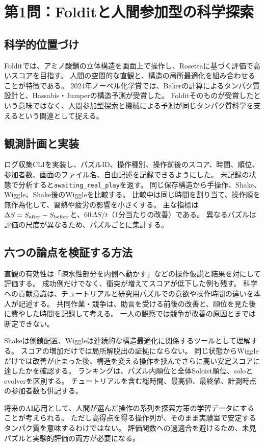 \section{第1問：Folditと人間参加型の科学探索}
\subsection{科学的位置づけ}
Folditでは、アミノ酸鎖の立体構造を画面上で操作し、Rosettaに基づく評価で高いスコアを目指す。
人間の空間的な直観と、構造の局所最適化を組み合わせることが特徴である\cite{foldit,cooper}。
2024年ノーベル化学賞では、Bakerの計算によるタンパク質設計と、Hassabis・Jumperの構造予測が受賞した\cite{nobel}。
Folditそのものが受賞したという意味ではなく、人間参加型探索と機械による予測が同じタンパク質科学を支えるという関連として捉える。

\subsection{観測計画と実装}
ログ収集CLIを実装し、パズルID、操作種別、操作前後のスコア、時間、順位、参加者数、画面のファイル名、自由記述を記録できるようにした。
未記録の状態で分析すると\texttt{awaiting\_real\_play}を返す。
同じ保存構造から手操作、Shake、Wiggle、Shake後のWiggleを比較する。
比較中は同じ時間を割り当て、操作順を無作為化して、習熟や疲労の影響を小さくする。
主な指標は\(\Delta S=S_{\rm after}-S_{\rm before}\)と、\(60\Delta S/t\)（1分当たりの改善）である。
異なるパズルは評価の尺度が異なるため、パズルごとに集計する。

\subsection{六つの論点を検証する方法}
直観の有効性は「疎水性部分を内側へ動かす」などの操作仮説と結果を対にして評価する。
成功例だけでなく、衝突が増えてスコアが低下した例も残す。
科学への貢献意識は、チュートリアルと研究用パズルでの意欲や操作時間の違いを本人が記述する。
共同作業・競争は、助言を受ける前後の改善と、順位を見た後に費やした時間を記録して考える。
一人の観察では競争が改善の原因とまでは断定できない。

Shakeは側鎖配置、Wiggleは連続的な構造最適化に関係するツールとして理解する\cite{foldit}。
スコアの増加だけでは局所解脱出の証拠にならない。
同じ状態からWiggleだけでは改善が止まった後、構造を変える操作を挟んでさらに高い安定スコアに達したかを確認する。
ランキングは、パズル内順位と全体Soloist順位、soloとevolverを区別する。
チュートリアルを含む総時間、最高値、最終値、計測時点の参加者数も併記する。

将来のAI応用として、人間が選んだ操作の系列を探索方策の学習データにすることが考えられる。
ただし高得点を得る操作列が、そのまま実験室で安定するタンパク質を意味するわけではない。
評価関数への過適合を避けるため、未見パズルと実験的評価の両方が必要になる。
